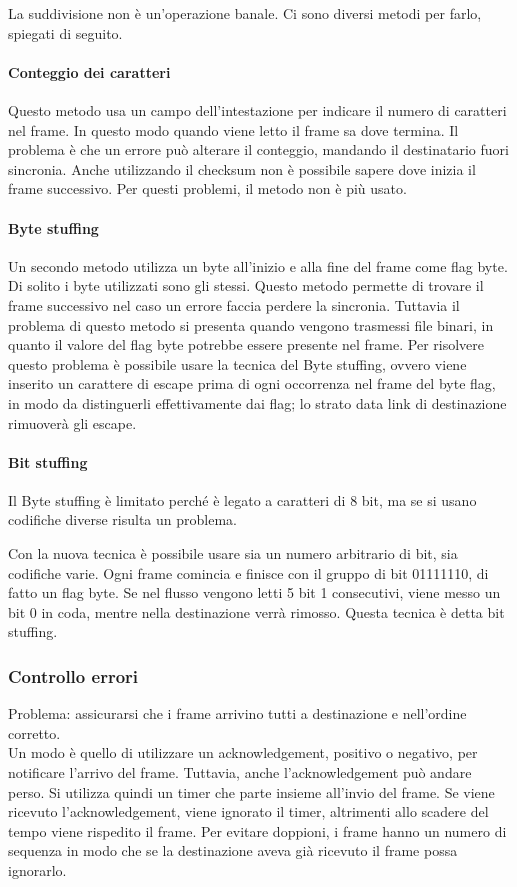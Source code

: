 La suddivisione non è un'operazione banale. Ci sono diversi metodi per farlo, spiegati di seguito.

\paragraph{Conteggio dei caratteri}
Questo metodo usa un campo dell'intestazione per indicare il numero di caratteri nel frame.
In questo modo quando viene letto il frame sa dove termina.
Il problema è che un errore può alterare il conteggio, mandando il destinatario fuori sincronia.
Anche utilizzando il checksum non è possibile sapere dove inizia il frame successivo.
Per questi problemi, il metodo non è più usato.

\paragraph{Byte stuffing}
Un secondo metodo utilizza un byte all'inizio e alla fine del frame come flag byte.
Di solito i byte utilizzati sono gli stessi.
Questo metodo permette di trovare il frame successivo nel caso un errore faccia perdere la sincronia.
Tuttavia il problema di questo metodo si presenta quando vengono trasmessi file binari, in quanto il valore del flag byte potrebbe essere presente nel frame.
Per risolvere questo problema è possibile usare la tecnica del Byte stuffing,
ovvero viene inserito un carattere di escape prima di ogni occorrenza nel frame del byte flag, in modo da distinguerli effettivamente dai flag;
lo strato data link di destinazione rimuoverà gli escape.

\paragraph{Bit stuffing}
Il Byte stuffing è limitato perché è legato a caratteri di 8 bit, ma se si usano codifiche diverse risulta un problema.

Con la nuova tecnica è possibile usare sia un numero arbitrario di bit, sia codifiche varie.
Ogni frame comincia e finisce con il gruppo di bit 01111110, di fatto un flag byte. 
Se nel flusso vengono letti 5 bit 1 consecutivi, viene messo un bit 0 in coda, mentre nella destinazione verrà rimosso.
Questa tecnica è detta bit stuffing.

\subsubsection{Controllo errori}
Problema: assicurarsi che i frame arrivino tutti a destinazione e nell'ordine corretto.\\
Un modo è quello di utilizzare un acknowledgement, positivo o negativo, per notificare l'arrivo del frame.
Tuttavia, anche l'acknowledgement può andare perso. Si utilizza quindi un timer che parte insieme all'invio del frame.
Se viene ricevuto l'acknowledgement, viene ignorato il timer, altrimenti allo scadere del tempo viene rispedito il frame.
Per evitare doppioni, i frame hanno un numero di sequenza in modo che se la destinazione aveva già ricevuto il frame possa ignorarlo.

